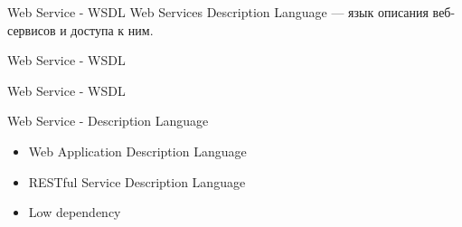 \begin{frame}{Web Service - WSDL}
Web Services Description Language — язык описания веб-сервисов и доступа к ним.
\end{frame}

\begin{frame}{Web Service - WSDL}
  \begin{center}
    
  \end{center}
\end{frame}

\begin{frame}{Web Service - WSDL}
  \begin{center}
    
  \end{center}
\end{frame}

\begin{frame}{Web Service - Description Language}
    \begin{itemize}
      \item Web Application Description Language
      \item RESTful Service Description Language
      \item Low dependency
    \end{itemize}
\end{frame}

